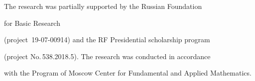 





\Ack

\noindent

The research was partially supported by the Russian Foundation 

for Basic Research

(project~19-07-00914) and the RF Presidential scholarship program 

(project No.\,538.2018.5). The research was conducted in accordance 

with the Program of Moscow Center for Fundamental and Applied Mathematics.






